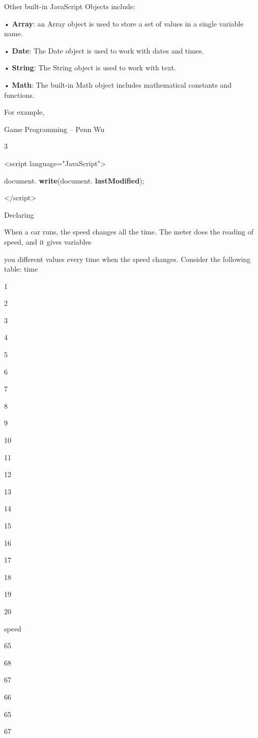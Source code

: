 \documentclass[
]{article}
\begin{document}
Other built-in JavaScript Objects include:

• \textbf{Array}: an Array object is used to store a set of values in a
single variable name.

• \textbf{Date}: The Date object is used to work with dates and times.

• \textbf{String}: The String object is used to work with text.

• \textbf{Math}: The built-in Math object includes mathematical
constants and functions.

For example,

Game Programming -- Penn Wu

3

\protect\hypertarget{index_split_001.htmlux5cux23p4}{}{}

\textless script language="JavaScript"\textgreater{}

document. \textbf{write}(document. \textbf{lastModified});

\textless/script\textgreater{}

Declaring

When a car runs, the speed changes all the time. The meter does the
reading of speed, and it gives variables

you different values every time when the speed changes. Consider the
following table: time

1

2

3

4

5

6

7

8

9

10

11

12

13

14

15

16

17

18

19

20

speed

65

68

67

66

65

67
\end{document}
